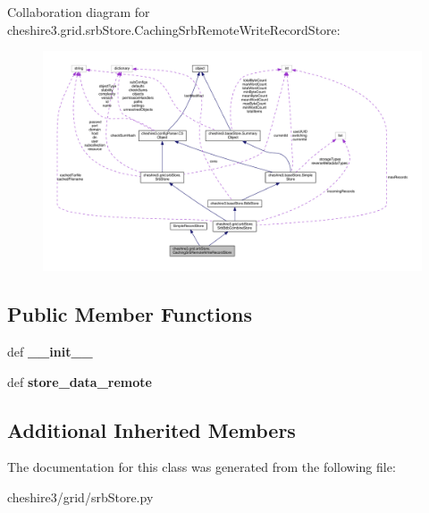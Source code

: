 Collaboration diagram for cheshire3.\-grid.\-srb\-Store.\-Caching\-Srb\-Remote\-Write\-Record\-Store\-:
\nopagebreak
\begin{figure}[H]
\begin{center}
\leavevmode
\includegraphics[width=350pt]{classcheshire3_1_1grid_1_1srb_store_1_1_caching_srb_remote_write_record_store__coll__graph}
\end{center}
\end{figure}
\subsection*{Public Member Functions}
\begin{DoxyCompactItemize}
\item 
\hypertarget{classcheshire3_1_1grid_1_1srb_store_1_1_caching_srb_remote_write_record_store_a56441955e6456999a06391610adc91a0}{def {\bfseries \-\_\-\-\_\-init\-\_\-\-\_\-}}\label{classcheshire3_1_1grid_1_1srb_store_1_1_caching_srb_remote_write_record_store_a56441955e6456999a06391610adc91a0}

\item 
\hypertarget{classcheshire3_1_1grid_1_1srb_store_1_1_caching_srb_remote_write_record_store_ad6ad83eb5d04a322434b19fb967d60cd}{def {\bfseries store\-\_\-data\-\_\-remote}}\label{classcheshire3_1_1grid_1_1srb_store_1_1_caching_srb_remote_write_record_store_ad6ad83eb5d04a322434b19fb967d60cd}

\end{DoxyCompactItemize}
\subsection*{Additional Inherited Members}


The documentation for this class was generated from the following file\-:\begin{DoxyCompactItemize}
\item 
cheshire3/grid/srb\-Store.\-py\end{DoxyCompactItemize}
